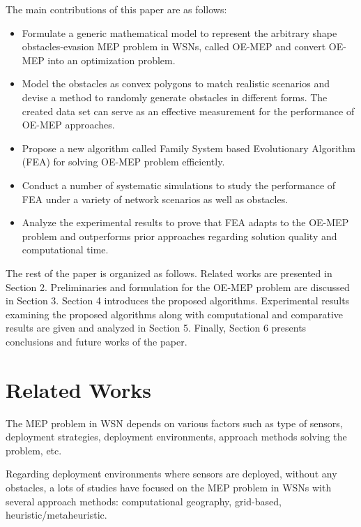 \documentclass[final]{elsarticle}
\begin{document}
The main contributions of this paper are as follows:
\begin{itemize}
	\itemsep0em
	\item Formulate a generic mathematical model to represent the arbitrary shape obstacles-evasion MEP problem in WSNs, called OE-MEP and convert OE-MEP into an optimization problem.
	\item Model the obstacles as convex polygons to match realistic scenarios and devise a method to randomly generate obstacles in different forms. The created data set can serve as an effective measurement for the performance of OE-MEP approaches.  
	\item Propose a new algorithm called Family System based Evolutionary Algorithm (FEA) for solving OE-MEP problem efficiently. 
	\item Conduct a number of systematic simulations to study the performance of FEA under a variety of network scenarios as well as obstacles.
	\item Analyze the experimental results to prove that FEA adapts to the OE-MEP problem and outperforms prior approaches regarding solution quality and computational time.	
\end{itemize}
The rest of the paper is organized as follows. Related works are presented in Section 2. Preliminaries and formulation for the OE-MEP problem are discussed in Section 3. Section 4 introduces the proposed algorithms. Experimental results examining the proposed algorithms along with computational and comparative results are given and analyzed in Section 5. Finally, Section 6 presents conclusions and future works of the paper.
\section{Related Works}
The MEP problem in WSN depends on various factors such as type of sensors, deployment strategies, deployment environments, approach methods solving the problem, etc. 

Regarding deployment environments where sensors are deployed, without any obstacles, a lots of studies have focused on the MEP problem in WSNs with several approach methods: computational geography, grid-based, heuristic/metaheuristic.
\end{document}

